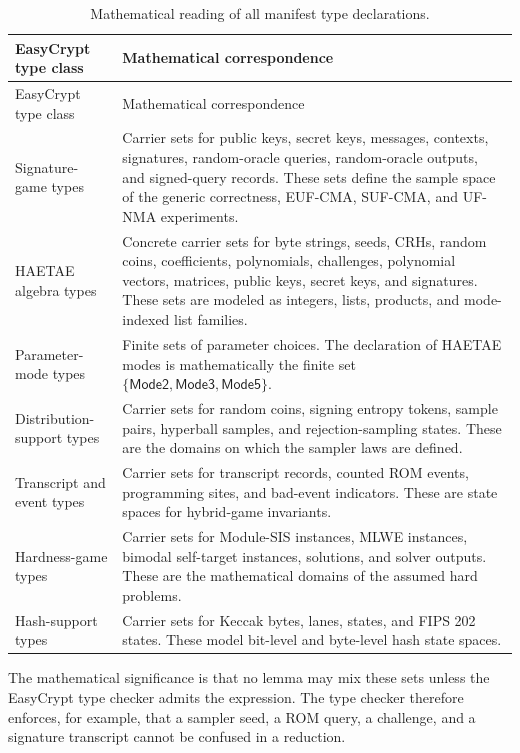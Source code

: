 \begin{longtable}{p{}p{}}
\caption{Mathematical reading of all manifest type declarations.}
\label{tab:type-correspondence}\\
\toprule
EasyCrypt type class & Mathematical correspondence \\
\midrule
\endfirsthead
\toprule
EasyCrypt type class & Mathematical correspondence \\
\midrule
\endhead
Signature-game types &
Carrier sets for public keys, secret keys, messages, contexts, signatures,
random-oracle queries, random-oracle outputs, and signed-query records.  These
sets define the sample space of the generic correctness, EUF-CMA, SUF-CMA, and
UF-NMA experiments. \\
HAETAE algebra types &
Concrete carrier sets for byte strings, seeds, CRHs, random coins, coefficients,
polynomials, challenges, polynomial vectors, matrices, public keys, secret keys,
and signatures.  These sets are modeled as integers, lists, products, and
mode-indexed list families. \\
Parameter-mode types &
Finite sets of parameter choices.  The declaration of HAETAE modes is
mathematically the finite set \(\{\mathsf{Mode2},\mathsf{Mode3},\mathsf{Mode5}\}\). \\
Distribution-support types &
Carrier sets for random coins, signing entropy tokens, sample pairs,
hyperball samples, and rejection-sampling states.  These are the domains on
which the sampler laws are defined. \\
Transcript and event types &
Carrier sets for transcript records, counted ROM events, programming sites, and
bad-event indicators.  These are state spaces for hybrid-game invariants. \\
Hardness-game types &
Carrier sets for Module-SIS instances, MLWE instances, bimodal self-target
instances, solutions, and solver outputs.  These are the mathematical domains of
the assumed hard problems. \\
Hash-support types &
Carrier sets for Keccak bytes, lanes, states, and FIPS 202 states.  These model
bit-level and byte-level hash state spaces. \\
\bottomrule
\end{longtable}

The mathematical significance is that no lemma may mix these sets unless the
EasyCrypt type checker admits the expression.  The type checker therefore
enforces, for example, that a sampler seed, a ROM query, a challenge, and a
signature transcript cannot be confused in a reduction.

